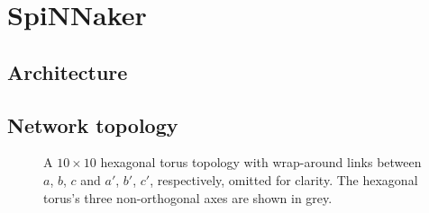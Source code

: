 	\section{SpiNNaker}
		\subsection{Architecture}
		\subsection{Network topology}
		
			
			
			\begin{figure}
				\center
				
				\caption{A $10 \times 10$ hexagonal torus topology with wrap-around
				links between $a$, $b$, $c$ and $a'$, $b'$, $c'$, respectively, omitted
				for clarity. The hexagonal torus's three non-orthogonal axes are shown
				in grey.}
				\label{fig:hexagonalTorusTopology}
			\end{figure}
			
